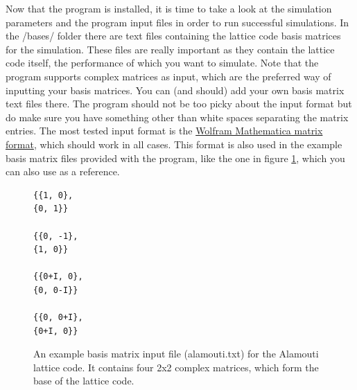 \documentclass[english,12pt,a4paper,pdftex,sci,utf8]{aaltothesis}
\begin{document}
Now that the program is installed, it is time to take a look at the simulation parameters and the program input files in order to run successful simulations. In the /bases/ folder there are text files containing the lattice code basis matrices for the simulation. These files are really important as they contain the lattice code itself, the performance of which you want to simulate. Note that the program supports complex matrices as input, which are the preferred way of inputting your basis matrices. You can (and should) add your own basis matrix text files there. The program should not be too picky about the input format but do make sure you have something other than white spaces separating the matrix entries. The most tested input format is the \href{http://reference.wolfram.com/language/tutorial/LinearAlgebraMatrixTypes.html#77896732}{Wolfram Mathematica matrix format}, which should work in all cases. This format is also used in the example basis matrix files provided with the program, like the one in figure \ref{fig:alamouti_basis}, which you can also use as a reference.
\begin{figure}[htb]
\begin{Verbatim}[frame=single]
{{1, 0},
{0, 1}}

{{0, -1},
{1, 0}}

{{0+I, 0},
{0, 0-I}}

{{0, 0+I},
{0+I, 0}}
\end{Verbatim}
\caption{An example basis matrix input file (alamouti.txt) for the Alamouti lattice code. It contains four 2x2 complex matrices, which form the base of the lattice code.}
\label{fig:alamouti_basis}
\end{figure}
\end{document}
